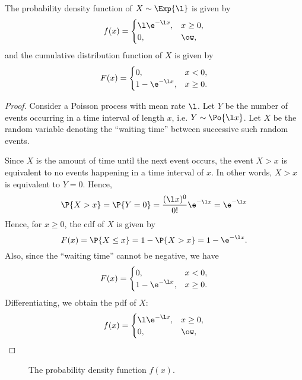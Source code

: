 \begin{proposition}
    The probability density function of $X \sim \Exp{\l}$ is given by \[f(x) = \begin{cases}
        \l \e^{-\l x}, & x \geq 0,\\
        0, & \ow,
    \end{cases}\] and the cumulative distribution function of $X$ is given by \[F(x) = \begin{cases}
        0, & x < 0,\\
        1 - \e^{-\l x}, & x \geq 0.
    \end{cases}\]
\end{proposition}
\begin{proof}
    Consider a Poisson process with mean rate $\l$. Let $Y$ be the number of events occurring in a time interval of length $x$, i.e. $Y \sim \Po{\l x}$. Let $X$ be the random variable denoting the ``waiting time'' between successive such random events.

    Since $X$ is the amount of time until the next event occurs, the event $X > x$ is equivalent to no events happening in a time interval of $x$. In other words, $X > x$ is equivalent to $Y = 0$. Hence, \[\P{X > x} = \P{Y = 0} = \frac{(\l x)^0}{0!} \e^{-\l x} = \e^{-\l x}\] Hence, for $x \geq 0$, the cdf of $X$ is given by \[F(x) = \P{X \leq x} = 1 - \P{X > x} = 1 - \e^{-\l x}.\] Also, since the ``waiting time'' cannot be negative, we have \[F(x) = \begin{cases}
        0, & x < 0,\\
        1 - \e^{-\l x}, & x \geq 0.
    \end{cases}\] Differentiating, we obtain the pdf of $X$: \[f(x) = \begin{cases}
        \l \e^{-\l x}, & x \geq 0,\\
        0, & \ow,
    \end{cases}\]
\end{proof}

\begin{figure}[H]
    \centering
    \caption{The probability density function $f(x)$.}
\end{figure}

